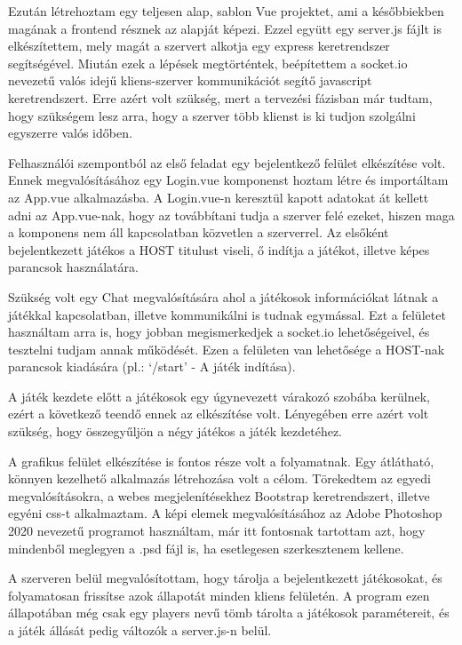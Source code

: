 	Ezután létrehoztam egy teljesen alap, sablon Vue projektet, ami a későbbiekben magának a frontend résznek az alapját képezi. Ezzel együtt egy server.js fájlt is elkészítettem, mely magát a szervert alkotja egy express keretrendszer segítségével. Miután ezek a lépések megtörténtek, beépítettem a socket.io nevezetű valós idejű kliens-szerver kommunikációt segítő javascript keretrendszert. Erre azért volt szükség, mert a tervezési fázisban már tudtam, hogy szükségem lesz arra, hogy a szerver több klienst is ki tudjon szolgálni egyszerre valós időben.

	Felhasználói szempontból az első feladat egy bejelentkező felület elkészítése volt. Ennek megvalósításához egy Login.vue komponenst hoztam létre és importáltam az App.vue alkalmazásba. A Login.vue-n keresztül kapott adatokat át kellett adni az App.vue-nak, hogy az továbbítani tudja a szerver felé ezeket, hiszen maga a komponens nem áll kapcsolatban közvetlen a szerverrel. Az elsőként bejelentkezett játékos a HOST titulust viseli, ő indítja a játékot, illetve képes parancsok használatára.

	Szükség volt egy Chat megvalósítására ahol a játékosok információkat látnak a játékkal kapcsolatban, illetve kommunikálni is tudnak egymással. Ezt a felületet használtam arra is, hogy jobban megismerkedjek a socket.io lehetőségeivel, és tesztelni tudjam annak működését. Ezen a felületen van lehetősége a HOST-nak parancsok kiadására (pl.: ‘/start’ - A játék indítása).

	A játék kezdete előtt a játékosok egy úgynevezett várakozó szobába kerülnek, ezért a következő teendő ennek az elkészítése volt. Lényegében erre azért volt szükség, hogy összegyűljön a négy játékos a játék kezdetéhez.

	A grafikus felület elkészítése is fontos része volt a folyamatnak. Egy átlátható, könnyen kezelhető alkalmazás létrehozása volt a célom. Törekedtem az egyedi megvalósításokra, a webes megjelenítésekhez Bootstrap keretrendszert, illetve egyéni css-t alkalmaztam. A képi elemek megvalósításához az Adobe Photoshop 2020 nevezetű programot használtam, már itt fontosnak tartottam azt, hogy mindenből meglegyen a .psd fájl is, ha esetlegesen szerkesztenem kellene.

	A szerveren belül megvalósítottam, hogy tárolja a bejelentkezett játékosokat, és folyamatosan frissítse azok állapotát minden kliens felületén. A program ezen állapotában még csak egy players nevű tömb tárolta a játékosok paramétereit, és a játék állását pedig változók a server.js-n belül.


